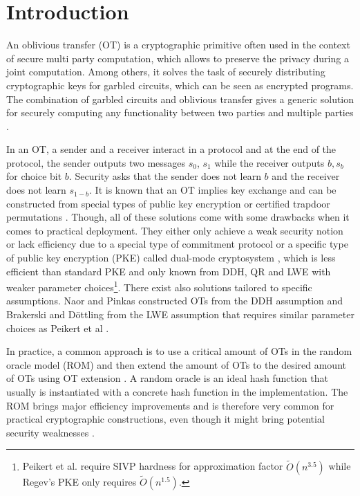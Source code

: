 \newcommand{\msng}{\textcolor{red}{(Missing References?)}}

\section{Introduction}

An oblivious transfer (OT) \cite{Rabin81,C:EveGolLem82} is a cryptographic primitive often used in the context of secure multi party computation, which allows to preserve the privacy during a joint computation. Among others, it solves the task of securely distributing cryptographic keys for garbled circuits, which can be seen as encrypted programs. The combination of garbled circuits and oblivious transfer gives a generic solution for securely computing any functionality between two parties \cite{FOCS:Yao82b,FOCS:Yao86,STOC:Kilian88,C:IshPraSah08,EC:IKOPS11} and multiple parties \cite{C:CreVanTap95,EC:BenLin18,EC:GarSri18a}.   


In an OT, a sender and a receiver interact in a protocol and at the end of the protocol, the sender outputs two messages $s_0$, $s_1$ while the receiver outputs $b, s_b$ for choice bit $b$. Security asks that the sender does not learn $b$ and the receiver does not learn $s_{1-b}$. It is known that an OT implies key exchange and can be constructed from special types of public key encryption \cite{FOCS:GKMRV00,C:PeiVaiWat08,cryptoeprint:2018:473} or certified trapdoor permutations \cite{C:OstRicSca15}. Though, all of these solutions come with some drawbacks when it comes to practical deployment. They either only achieve a weak security notion \cite{FOCS:GKMRV00} or lack efficiency due to a special type of commitment protocol \cite{STOC:Kilian92,C:OstRicSca15,cryptoeprint:2018:473} or a specific type of public key encryption (PKE) called dual-mode cryptosystem \cite{C:PeiVaiWat08}, which is less efficient than standard PKE and only known from DDH, QR and LWE with weaker parameter choices\footnote{Peikert et al. require SIVP hardness for approximation factor $\tilde{O}(n^{3.5})$ while Regev's PKE \cite{STOC:Regev05} only requires $\tilde{O}(n^{1.5})$.}. There exist also solutions tailored to specific assumptions. Naor and Pinkas \cite{SODA:NaoPin01} constructed OTs from the DDH assumption and Brakerski and D\"ottling \cite{TCC:BraDot18} from the LWE assumption that requires similar parameter choices as Peikert et al \cite{C:PeiVaiWat08}.

In practice, a common approach is to use a critical amount of OTs in the random oracle model (ROM) \cite{CCS:BelRog93} and then extend the amount of OTs to the desired amount of OTs using OT extension \cite{STOC:Beaver96a,C:IKNP03,RSA:OrrOrsSch17,EC:ALSZ15,C:KelOrsSch15}. A random oracle is an ideal hash function that usually is instantiated with a concrete hash function in the implementation. The ROM brings major efficiency improvements and is therefore very common for practical cryptographic constructions, even though it might bring potential security weaknesses \cite{STOC:CanGolHal98}. 

